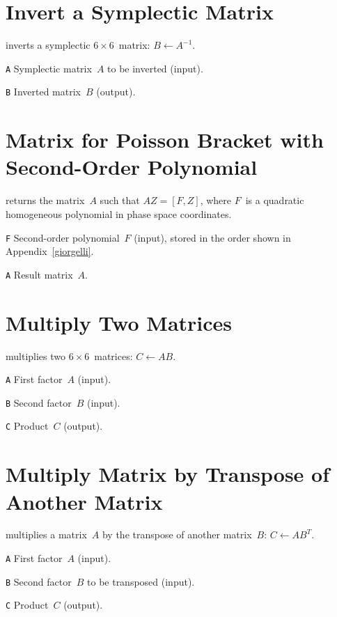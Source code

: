 \section{Invert a Symplectic Matrix}
\label{M66INV}
inverts a symplectic $6 \times 6$~matrix: $B \leftarrow A^{-1}$.
\begin{mylist}
\item[\tt A]
Symplectic matrix~$A$ to be inverted (input).
\item[\tt B]
Inverted matrix~$B$ (output).
\end{mylist}

\section{Matrix for Poisson Bracket with Second-Order Polynomial}
\label{M66MAK}
returns the matrix~$A$ such that $AZ = [F,Z]$,
where $F$~is a quadratic homogeneous polynomial in phase space
coordinates. 
\begin{mylist}
\item[\tt F]
Second-order polynomial~$F$ (input),
stored in the order shown in Appendix~\ref{giorgelli}.
\item[\tt A]
Result matrix~$A$.
\end{mylist}

\section{Multiply Two Matrices}
\label{M66MTR}
multiplies two $6 \times 6$~matrices: $C \leftarrow A B$.
\begin{mylist}
\item[\tt A]
First factor~$A$ (input).
\item[\tt B]
Second factor~$B$ (input).
\item[\tt C]
Product~$C$ (output).
\end{mylist}

\section{Multiply Matrix by Transpose of Another Matrix}
\label{M66MPY}
multiplies a matrix~$A$ by the transpose of another matrix~$B$:
$C \leftarrow A B^T$.
\begin{mylist}
\item[\tt A]
First factor~$A$ (input).
\item[\tt B]
Second factor~$B$ to be transposed (input).
\item[\tt C]
Product~$C$ (output).
\end{mylist}

